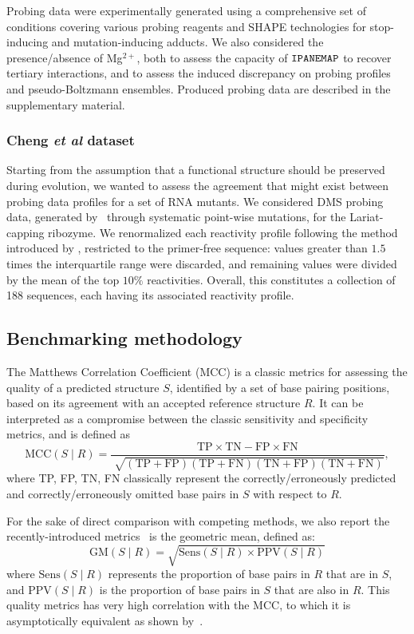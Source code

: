 \documentclass[a4,center,fleqn]{NAR}
\newcommand{\Software}[1]{$\text{\ttfamily #1}$}
\newcommand{\OurTool}{\Software{IPANEMAP}\xspace}
\newcommand{\GMean}{\text{GM}}
\newcommand{\Ref}{R}
\begin{document}
Probing data were experimentally generated using a comprehensive set of conditions covering various probing reagents and SHAPE technologies for stop-inducing and mutation-inducing adducts. We also considered the presence/absence of Mg$^{2+}$, both to assess the capacity of \OurTool{} to recover tertiary interactions, and to assess the induced discrepancy on probing profiles and pseudo-Boltzmann ensembles. Produced probing data are described in the supplementary material.


\subsubsection{Cheng  \emph{et al} dataset} 

Starting from the assumption that a functional structure should be preserved during evolution, we wanted to assess the agreement that might exist between probing data profiles for a set of RNA mutants. 
We considered DMS probing data, generated by~\cite{Cheng2017} through systematic point-wise mutations, for the Lariat-capping ribozyme. We renormalized each reactivity profile following the method introduced by \citet{Deigan2009}, restricted to the primer-free sequence: values greater than $1.5 $ times the interquartile range were discarded, and remaining values were divided by the mean of the top $10\%$ reactivities.  Overall, this constitutes a collection of 188 sequences, each having its associated reactivity profile.


\subsection{Benchmarking methodology}

The Matthews Correlation Coefficient (MCC) is a classic metrics for assessing the quality of a predicted structure $S$, identified by a set of base pairing positions, based on its agreement with an accepted reference structure $\Ref$. It can be interpreted as a compromise between the classic sensitivity and specificity metrics, and is defined as 
$$\text{MCC}(S\mid \Ref)=\frac{\text{TP} \times \text{TN} -\text{FP} \times \text{FN}}{\sqrt[]{(\text{TP}+\text{FP})(\text{TP}+\text{FN})(\text{TN}+\text{FP})(\text{TN}+\text{FN})}},$$
where TP, FP, TN, FN classically represent the correctly/erroneously predicted and correctly/erroneously omitted base pairs in $S$ with respect to $\Ref$.

For the sake of direct comparison with competing methods, we also report the recently-introduced metrics~\citep{Mathews2017} is the geometric mean, defined as:
$$ \GMean(S\mid \Ref)=\sqrt{\text{Sens}(S\mid \Ref)\times \text{PPV}(S\mid\Ref)} $$
where $\text{Sens}(S\mid \Ref)$ represents the proportion of base pairs in $\Ref$ that are in $S$, and $\text{PPV}(S\mid \Ref)$ is the proportion of base pairs in $S$ that are also in $\Ref$. This quality metrics has very high correlation with the MCC, to which it is asymptotically equivalent as shown by~\citet{Gorodkin2001}.
\end{document}
